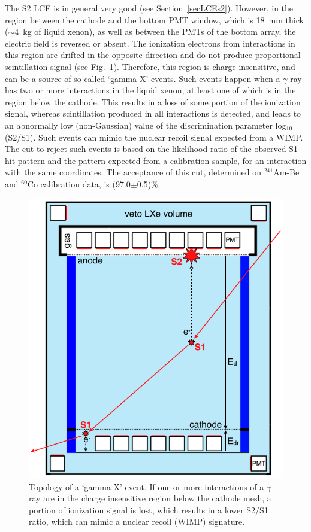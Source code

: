 The S2 LCE is in general very good (see Section~\ref{secLCEs2}). However, in the region between the cathode and the bottom PMT window, which is 18~mm thick ($\sim$4~kg of liquid xenon), as well as between the PMTs of the bottom array, the electric field is reversed or absent. The ionization electrons from interactions in this region are drifted in the opposite direction and do not produce proportional scintillation signal (see Fig.~\ref{figGammaXtopology}). Therefore, this region is charge insensitive, and can be a source of so-called `gamma-X' events. Such events happen when a $\gamma$-ray has two or more interactions in the liquid xenon, at least one of which is in the region below the cathode. This results in a loss of some portion of the ionization signal, whereas scintillation produced in all interactions is detected, and leads to an abnormally low (non-Gaussian) value of the discrimination parameter log$_{10}$(S2/S1). Such events can mimic the nuclear recoil signal expected from a WIMP. 
The cut to reject such events is based on the likelihood ratio of the observed S1 hit pattern and the pattern expected from a calibration sample, for an interaction with the same coordinates. The acceptance of this cut, determined on $^{241}$Am-Be and $^{60}$Co calibration data, is (97.0$\pm$0.5)\%.

\begin{figure}[!h]
\centering
\includegraphics[width=0.4\linewidth]{plots/DataQualityCuts/GammaXtopology.png}
\caption[Topology of a `gamma-X' event]{Topology of a `gamma-X' event. If one or more interactions of a $\gamma$-ray are in the charge insensitive region below the cathode mesh, a portion of ionization signal is lost, which results in a lower S2/S1 ratio, which can mimic a nuclear recoil (WIMP) signature.}
\label{figGammaXtopology}
\end{figure}



